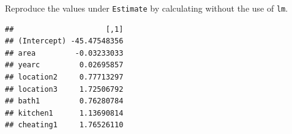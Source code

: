 \documentclass[10pt,ignorenonframetext,]{beamer}
\newenvironment{Shaded}{\begin{snugshade}}{\end{snugshade}}
\newcommand{\KeywordTok}[1]{\textcolor[rgb]{0.13,0.29,0.53}{\textbf{#1}}}
\newcommand{\DataTypeTok}[1]{\textcolor[rgb]{0.13,0.29,0.53}{#1}}
\newcommand{\StringTok}[1]{\textcolor[rgb]{0.31,0.60,0.02}{#1}}
\newcommand{\OperatorTok}[1]{\textcolor[rgb]{0.81,0.36,0.00}{\textbf{#1}}}
\newcommand{\NormalTok}[1]{#1}
\begin{document}
\begin{frame}[fragile]

Reproduce the values under \texttt{Estimate} by calculating without the
use of \texttt{lm}.

\begin{Shaded}
\end{Shaded}

\begin{verbatim}
##                     [,1]
## (Intercept) -45.47548356
## area         -0.03233033
## yearc         0.02695857
## location2     0.77713297
## location3     1.72506792
## bath1         0.76280784
## kitchen1      1.13690814
## cheating1     1.76526110
\end{verbatim}

\end{frame}
\end{document}
